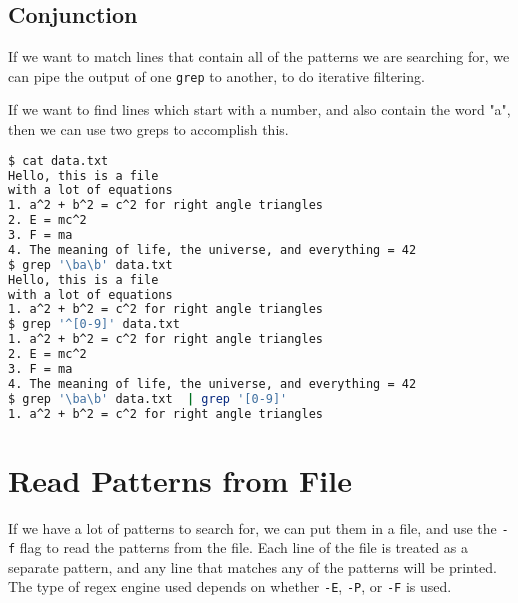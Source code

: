 \subsection{Conjunction}

If we want to match lines that contain all of the patterns we are searching for, we can pipe the output of one \lstinline|grep| to another, to do iterative filtering.

If we want to find lines which start with a number, and also contain the word "a", then we can use two greps to accomplish this.

\begin{lstlisting}[language=bash]
$ cat data.txt
Hello, this is a file
with a lot of equations
1. a^2 + b^2 = c^2 for right angle triangles
2. E = mc^2
3. F = ma
4. The meaning of life, the universe, and everything = 42
$ grep '\ba\b' data.txt
Hello, this is a file
with a lot of equations
1. a^2 + b^2 = c^2 for right angle triangles
$ grep '^[0-9]' data.txt
1. a^2 + b^2 = c^2 for right angle triangles
2. E = mc^2
3. F = ma
4. The meaning of life, the universe, and everything = 42
$ grep '\ba\b' data.txt  | grep '[0-9]'
1. a^2 + b^2 = c^2 for right angle triangles
\end{lstlisting}

\section{Read Patterns from File}

If we have a lot of patterns to search for, we can put them in a file, and use the \lstinline|-f| flag to read the patterns from the file. Each line of the file
is treated as a separate pattern, and any line that matches any of the patterns will be printed.
The type of regex engine used depends on whether \lstinline|-E|, \lstinline|-P|, or \lstinline|-F| is used.

